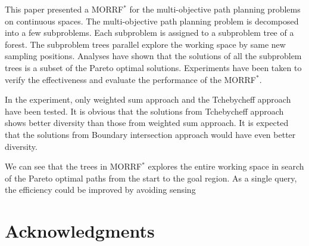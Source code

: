 \documentclass[conference]{IEEEtran}
\begin{document}
This paper presented a MORRF$^{*}$ for the multi-objective path planning problems on continuous spaces.
The multi-objective path planning problem is decomposed into a few subproblems.
Each subproblem is assigned to a subproblem tree of a forest.
The subproblem trees parallel explore the working space by same new sampling positions.
Analyses have shown that the solutions of all the subproblem trees is a subset of the Pareto optimal solutions.
Experiments have been taken to verify the effectiveness and evaluate the performance of the MORRF$^{*}$.

In the experiment, only weighted sum approach and the Tchebycheff approach have been tested. 
It is obvious that the solutions from Tchebycheff approach shows better diversity than those from weighted sum approach.
It is expected that the solutions from Boundary intersection approach would have even better diversity.

We can see that the trees in MORRF$^{*}$ explores the entire working space in search of the Pareto optimal paths from the start to the goal region.
As a single query, the efficiency could be improved by avoiding sensing 

\section*{Acknowledgments}




\end{document}
